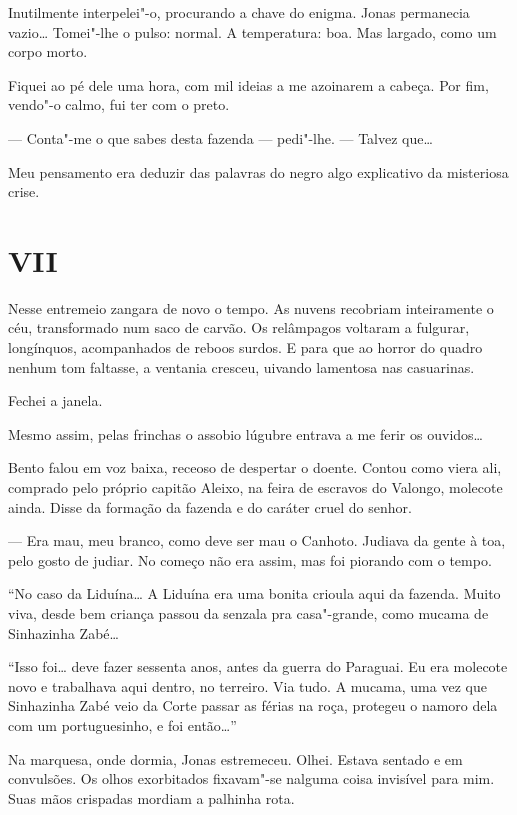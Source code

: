 Inutilmente interpelei"-o, procurando a chave do enigma. Jonas permanecia
vazio\ldots{} Tomei"-lhe o pulso: normal. A temperatura: boa. Mas largado,
como um corpo morto.

Fiquei ao pé dele uma hora, com mil ideias a me azoinarem a cabeça. Por
fim, vendo"-o calmo, fui ter com o preto.

--- Conta"-me o que sabes desta fazenda --- pedi"-lhe. --- Talvez que\ldots{}

Meu pensamento era deduzir das palavras do negro algo explicativo da
misteriosa crise.

\section*{VII}

Nesse entremeio zangara de novo o tempo. As nuvens recobriam
inteiramente o céu, transformado num saco de carvão. Os relâmpagos
voltaram a fulgurar, longínquos, acompanhados de reboos surdos. E para
que ao horror do quadro nenhum tom faltasse, a ventania cresceu, uivando
lamentosa nas casuarinas.

Fechei a janela.

Mesmo assim, pelas frinchas o assobio lúgubre entrava a me ferir os
ouvidos\ldots{}

Bento falou em voz baixa, receoso de despertar o doente. Contou como
viera ali, comprado pelo próprio capitão Aleixo, na feira de escravos do
Valongo, molecote ainda. Disse da formação da fazenda e do caráter cruel
do senhor.

--- Era mau, meu branco, como deve ser mau o Canhoto. Judiava da gente à
toa, pelo gosto de judiar. No começo não era assim, mas foi piorando com
o tempo.

``No caso da Liduína\ldots{} A Liduína era uma bonita crioula aqui da
fazenda. Muito viva, desde bem criança passou da senzala pra
casa"-grande, como mucama de Sinhazinha Zabé\ldots{}

``Isso foi\ldots{} deve fazer sessenta anos, antes da guerra do Paraguai. Eu
era molecote novo e trabalhava aqui dentro, no terreiro. Via tudo. A
mucama, uma vez que Sinhazinha Zabé veio da Corte passar as férias na
roça, protegeu o namoro dela com um portuguesinho, e foi então\ldots{}''

Na marquesa, onde dormia, Jonas estremeceu. Olhei. Estava sentado e em
convulsões. Os olhos exorbitados fixavam"-se nalguma coisa invisível para
mim. Suas mãos crispadas mordiam a palhinha rota.

